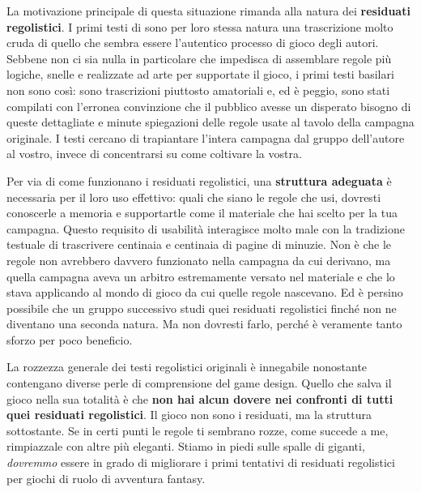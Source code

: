 La motivazione principale di questa situazione rimanda alla natura dei \textbf{residuati regolistici}. I primi testi di \dnd{} sono per loro stessa natura una trascrizione molto cruda di quello che sembra essere l'autentico processo di gioco degli autori. Sebbene non ci sia nulla in particolare che impedisca di assemblare regole più logiche, snelle e realizzate ad arte per supportate il gioco, i primi testi basilari non sono così: sono trascrizioni piuttosto amatoriali e, ed è peggio, sono stati compilati con l'erronea convinzione che il pubblico avesse un disperato bisogno di queste dettagliate e minute spiegazioni delle regole usate al tavolo della campagna originale. I testi cercano di trapiantare l'intera campagna dal gruppo dell'autore al vostro, invece di concentrarsi su come coltivare la vostra.

Per via di come funzionano i residuati regolistici, una \textbf{struttura adeguata} è necessaria per il loro uso effettivo: quali che siano le regole che usi, dovresti conoscerle a memoria e supportartle come il materiale che hai scelto per la tua campagna. Questo requisito di usabilità interagisce molto male con la tradizione testuale di trascrivere centinaia e centinaia di pagine di minuzie. Non è che le regole non avrebbero davvero funzionato nella campagna da cui derivano, ma quella campagna aveva un arbitro estremamente versato nel materiale e che lo stava applicando al mondo di gioco da cui quelle regole nascevano. Ed è persino possibile che un gruppo successivo studi quei residuati regolistici finché non ne diventano una seconda natura. Ma non dovresti farlo, perché è veramente tanto sforzo per poco beneficio.

La rozzezza generale dei testi regolistici originali è innegabile nonostante contengano diverse perle di comprensione del game design. Quello che salva il gioco nella sua totalità è che \textbf{non hai alcun dovere nei confronti di tutti quei residuati regolistici}. Il gioco non sono i residuati, ma la struttura sottostante. Se in certi punti le regole ti sembrano rozze, come succede a me, rimpiazzale con altre più eleganti. Stiamo in piedi sulle spalle di giganti, \textit{dovremmo} essere in grado di migliorare i primi tentativi di residuati regolistici per giochi di ruolo di avventura fantasy.

